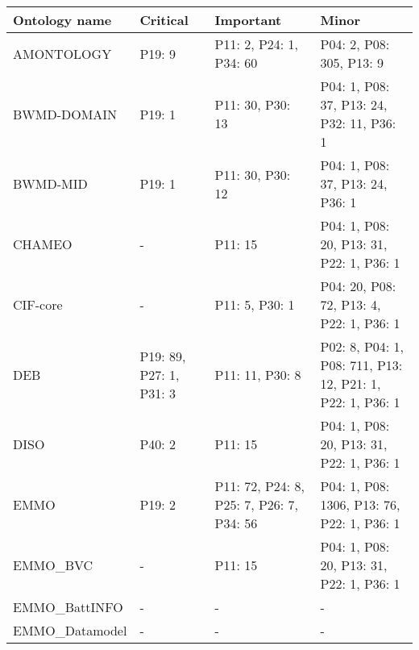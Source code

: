 \begin{tabular}{m{4cm}m{3cm}m{3cm}m{5cm}}
\toprule
          Ontology name &                Critical &                                                Important &                                                      Minor \\
\midrule
             AMONTOLOGY &                  P19: 9 &                                  P11: 2, P24: 1, P34: 60 &                                   P04: 2, P08: 305, P13: 9 \\
            BWMD-DOMAIN &                  P19: 1 &                                         P11: 30, P30: 13 &                  P04: 1, P08: 37, P13: 24, P32: 11, P36: 1 \\
               BWMD-MID &                  P19: 1 &                                         P11: 30, P30: 12 &                           P04: 1, P08: 37, P13: 24, P36: 1 \\
                 CHAMEO &                       - &                                                  P11: 15 &                   P04: 1, P08: 20, P13: 31, P22: 1, P36: 1 \\
               CIF-core &                       - &                                           P11: 5, P30: 1 &                   P04: 20, P08: 72, P13: 4, P22: 1, P36: 1 \\
                    DEB & P19: 89, P27: 1, P31: 3 &                                          P11: 11, P30: 8 &  P02: 8, P04: 1, P08: 711, P13: 12, P21: 1, P22: 1, P36: 1 \\
                   DISO &                  P40: 2 &                                                  P11: 15 &                   P04: 1, P08: 20, P13: 31, P22: 1, P36: 1 \\
                   EMMO &                  P19: 2 &                 P11: 72, P24: 8, P25: 7, P26: 7, P34: 56 &                 P04: 1, P08: 1306, P13: 76, P22: 1, P36: 1 \\
               EMMO_BVC &                       - &                                                  P11: 15 &                   P04: 1, P08: 20, P13: 31, P22: 1, P36: 1 \\
          EMMO_BattINFO &                       - &                                                        - &                                                          - \\
         EMMO_Datamodel &                       - &                                                        - &                                                          - \\

\end{tabular}
